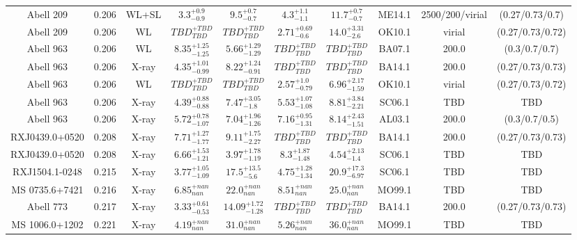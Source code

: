 \begin{table}
\begin{tabular}{cccccccccc}
Abell 209 & 0.206 & WL+SL & ${3.3}^{+0.9}_{-0.9}$ & ${9.5}^{+0.7}_{-0.7}$ & ${4.3}^{+1.1}_{-1.1}$ & ${11.7}^{+0.7}_{-0.7}$ & ME14.1 & 2500/200/virial & (0.27/0.73/0.7) \\
Abell 209 & 0.206 & WL & ${TBD}^{+TBD}_{TBD}$ & ${TBD}^{+TBD}_{TBD}$ & ${2.71}^{+0.69}_{-0.6}$ & ${14.0}^{+3.31}_{-2.6}$ & OK10.1 & virial & (0.27/0.73/0.72) \\
Abell 963 & 0.206 & WL & ${8.35}^{+1.25}_{-1.25}$ & ${5.66}^{+1.29}_{-1.29}$ & ${TBD}^{+TBD}_{TBD}$ & ${TBD}^{+TBD}_{TBD}$ & BA07.1 & 200.0 & (0.3/0.7/0.7) \\
Abell 963 & 0.206 & X-ray & ${4.35}^{+1.01}_{-0.99}$ & ${8.22}^{+1.24}_{-0.91}$ & ${TBD}^{+TBD}_{TBD}$ & ${TBD}^{+TBD}_{TBD}$ & BA14.1 & 200.0 & (0.27/0.73/0.73) \\
Abell 963 & 0.206 & WL & ${TBD}^{+TBD}_{TBD}$ & ${TBD}^{+TBD}_{TBD}$ & ${2.57}^{+1.0}_{-0.79}$ & ${6.96}^{+2.17}_{-1.59}$ & OK10.1 & virial & (0.27/0.73/0.72) \\
Abell 963 & 0.206 & X-ray & ${4.39}^{+0.88}_{-0.88}$ & ${7.47}^{+3.05}_{-1.8}$ & ${5.53}^{+1.07}_{-1.08}$ & ${8.81}^{+3.84}_{-2.21}$ & SC06.1 & TBD & TBD \\
Abell 963 & 0.206 & X-ray & ${5.72}^{+0.78}_{-1.07}$ & ${7.04}^{+1.96}_{-1.26}$ & ${7.16}^{+0.95}_{-1.31}$ & ${8.14}^{+2.43}_{-1.51}$ & AL03.1 & 200.0 & (0.3/0.7/0.5) \\
RXJ0439.0+0520 & 0.208 & X-ray & ${7.71}^{+1.27}_{-1.77}$ & ${9.11}^{+1.75}_{-2.27}$ & ${TBD}^{+TBD}_{TBD}$ & ${TBD}^{+TBD}_{TBD}$ & BA14.1 & 200.0 & (0.27/0.73/0.73) \\
RXJ0439.0+0520 & 0.208 & X-ray & ${6.66}^{+1.53}_{-1.21}$ & ${3.97}^{+1.78}_{-1.19}$ & ${8.3}^{+1.87}_{-1.48}$ & ${4.54}^{+2.13}_{-1.4}$ & SC06.1 & TBD & TBD \\
RXJ1504.1-0248 & 0.215 & X-ray & ${3.77}^{+1.05}_{-1.09}$ & ${17.5}^{+13.5}_{-5.6}$ & ${4.75}^{+1.28}_{-1.34}$ & ${20.9}^{+17.3}_{-6.97}$ & SC06.1 & TBD & TBD \\
MS 0735.6+7421 & 0.216 & X-ray & ${6.85}^{+nan}_{nan}$ & ${22.0}^{+nan}_{nan}$ & ${8.51}^{+nan}_{nan}$ & ${25.0}^{+nan}_{nan}$ & MO99.1 & TBD & TBD \\
Abell 773 & 0.217 & X-ray & ${3.33}^{+0.61}_{-0.53}$ & ${14.09}^{+1.72}_{-1.28}$ & ${TBD}^{+TBD}_{TBD}$ & ${TBD}^{+TBD}_{TBD}$ & BA14.1 & 200.0 & (0.27/0.73/0.73) \\
MS 1006.0+1202 & 0.221 & X-ray & ${4.19}^{+nan}_{nan}$ & ${31.0}^{+nan}_{nan}$ & ${5.26}^{+nan}_{nan}$ & ${36.0}^{+nan}_{nan}$ & MO99.1 & TBD & TBD \\

\end{tabular}
\end{table}
